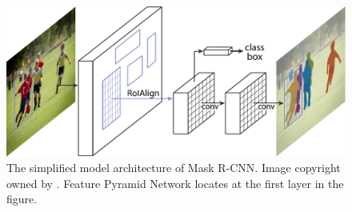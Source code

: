 \begin{figure}[!h]
	\centering
	\includegraphics[width=\figf\textwidth]{2-03.pdf}
    \caption[The simplified model architecture of Mask R-CNN]{The simplified model architecture of Mask R-CNN. Image copyright owned by \cite{maskrcnn}. Feature Pyramid Network locates at the first layer in the figure.}
    \label{fig:rcnnsimmod}
\end{figure}